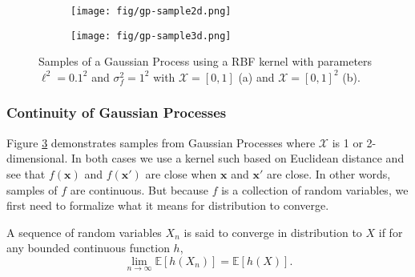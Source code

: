 \begin{figure}
    \centering
    \begin{subfigure}[b]{0.45\textwidth}
        \centering
        \texttt{[image: fig/gp-sample2d.png]}
        \caption{}
        \label{subfig:2d-gp-sample}
    \end{subfigure}
    \hfill
    \begin{subfigure}[b]{0.45\textwidth}
        \centering
        \texttt{[image: fig/gp-sample3d.png]}
        \caption{}
        \label{subfig:3d-gp-sample}
    \end{subfigure}
    \hfill
    \caption{Samples of a Gaussian Process using a RBF kernel with parameters $\ell^{2} = 0.1^2$ and $\sigma^{2}_f = 1 ^ 2$ with
    $\mathcal{X} = [0, 1]$ (a) and $\mathcal{X} = [0, 1]^2$ (b).
    }
    \label{fig:gp-sample}
\end{figure}

\subsubsection{Continuity of Gaussian Processes}

Figure \ref{fig:gp-sample} demonstrates samples from Gaussian Processes where $\mathcal{X}$ is 1 or 2-dimensional.
In both cases we use a kernel such based on Euclidean distance and see that $f(\mathbf{x})$ and $f(\mathbf{x}')$ are close when $\mathbf{x}$ and $\mathbf{x}'$ are close.
In other words, samples of $f$ are continuous.
But because $f$ is a collection of random variables, we first need to formalize what it means for distribution to converge.

\begin{definition}\label{def:cvg-dst}
    A sequence of random variables $X_n$ is said to converge in distribution to $X$
    if for any bounded continuous function $h$,
    \begin{equation*}
        \lim_{n\to \infty} \mathbb{E}[h(X_n)] = \mathbb{E}[h(X)].
    \end{equation*}
\end{definition}


